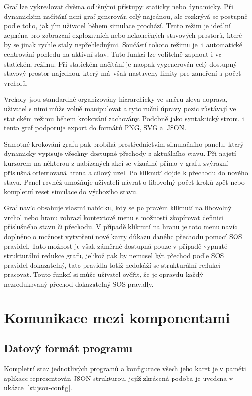 Graf lze vykreslovat dvěma odlišnými přístupy: staticky nebo dynamicky. 
Při dynamickém načítání není graf generován celý najednou, ale rozkrývá se postupně podle toho, jak jím uživatel během simulace prochází. 
Tento režim je ideální zejména pro zobrazení explozivních nebo nekonečných stavových prostorů, které by se jinak rychle staly nepřehlednými. 
Součástí tohoto režimu je~i~automatické centrování pohledu na aktivní stav. 
Tuto funkci lze volitelně zapnout i ve statickém režimu.
Při statickém načítání je naopak vygenerován celý dostupný stavový prostor najednou, který má~však nastaveny limity pro zanoření a počet vrcholů. 

Vrcholy jsou standardně organizovány hierarchicky ve směru zleva doprava, uživatel s nimi může volně manipulovat a tyto ruční úpravy pozic zůstávají ve statickém režimu během krokování zachovány. 
Podobně jako syntaktický strom, i tento graf podporuje export do formátů PNG, SVG a~JSON.

Samotné krokování grafu pak probíhá prostřednictvím simulačního panelu, který dynamicky vypisuje všechny dostupné přechody z aktuálního stavu. 
Při najetí kurzorem na některou z nabízených akcí se vizuálně přímo v grafu zvýrazní příslušná orientovaná hrana a cílový uzel. 
Po kliknutí dojde k přechodu do nového stavu. 
Panel rovněž umožňuje uživateli návrat o libovolný počet kroků zpět nebo kompletní reset simulace do výchozího stavu.

Graf navíc obsahuje vlastní nabídku, kdy se po pravém kliknutí na libovolný vrchol nebo hranu zobrazí kontextové menu s možností zkopírovat definici příslušného stavu či přechodu. 
V případě kliknutí na hranu je toto menu navíc doplněno o možnost vytvoření nové karty důkazu daného přechodu pomocí SOS pravidel.
Tato možnost je však záměrně dostupná pouze v případě vypnuté strukturální redukce grafu, jelikož pak by nemusel být přechod podle SOS pravidel dokazatelný, tato pravidla totiž nedokáží se strukturální redukcí pracovat.
Touto funkcí si může uživatel ověřit, že je opravdu každý nezredukovaný přechod dokazatelný SOS pravidly.

\section{Komunikace mezi komponentami}

\subsection{Datový formát programu}
\label{sec:json_format}
Kompletní stav jednotlivých programů a konfigurace všech jeho karet je v paměti aplikace reprezentován JSON strukturou, jejíž zkrácená podoba je uvedena v ukázce \ref{lst:json-config}. 

